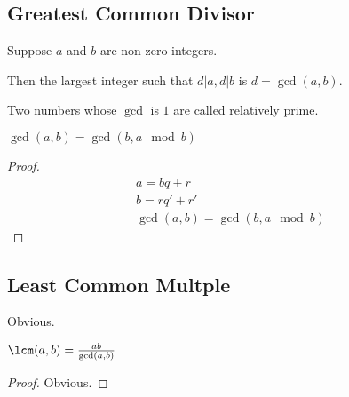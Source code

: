 \documentclass{scrreprt}
\begin{document}
\subsection{Greatest Common Divisor}

Suppose $a$ and $b$ are non-zero integers.

Then the largest integer such that $d|a, d|b$ is $d = \gcd(a, b)$.

Two numbers whose $\gcd$ is $1$ are called relatively prime.

\begin{theorem}
	$\gcd(a, b) = \gcd(b, a \mod b)$
	\begin{proof}
		\begin{align*}
			a = bq + r \\
			b = rq' + r' \\
			\gcd(a, b) = \gcd(b, a \mod b)
		\end{align*}
	\end{proof}
\end{theorem}

\subsection{Least Common Multple}

Obvious.

\begin{theorem}
	$\lcm(a, b) = \frac{ab}{\gcd(a, b)}$
	\begin{proof}
		Obvious.
	\end{proof}
\end{theorem}
\end{document}
